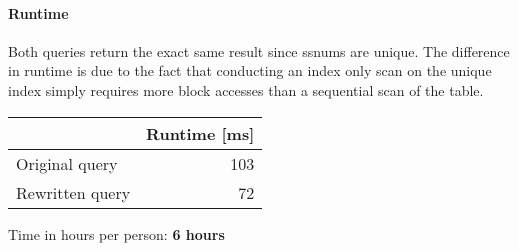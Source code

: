 \documentclass[11pt]{scrartcl}
\begin{document}
\paragraph{Runtime}
Both queries return the exact same result since ssnums are unique. The difference in runtime is due to the fact that conducting an index only scan on the unique index simply requires more block accesses than a sequential scan of the table.

\begin{table}[H]
  \begin{tabular}{l|r}
    & Runtime [ms] \\
   \hline
    Original query & 103 \\
    Rewritten query & 72 \\
  \end{tabular}
\end{table}


  Time in hours per person: {\textbf{6 hours}}
\end{document}
